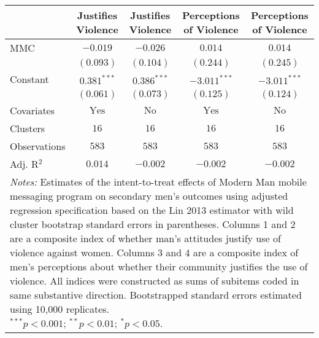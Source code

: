 
\begin{tabular}{l c c c c}
\toprule
 & Justifies Violence & Justifies Violence & Perceptions of Violence & Perceptions of Violence \\
\midrule
MMC          & $-0.019$       & $-0.026$      & $0.014$        & $0.014$        \\
             & $(0.093)$      & $(0.104)$     & $(0.244)$      & $(0.245)$      \\
Constant     & $0.381^{***}$  & $0.386^{***}$ & $-3.011^{***}$ & $-3.011^{***}$ \\
             & $(0.061)$      & $(0.073)$     & $(0.125)$      & $(0.124)$      \\
\midrule
Covariates   & $\textrm{Yes}$ & $\textrm{No}$ & $\textrm{Yes}$ & $\textrm{No}$  \\
Clusters     & $16$           & $16$          & $16$           & $16$           \\
Observations & $583$          & $583$         & $583$          & $583$          \\
Adj. R$^2$   & $0.014$        & $-0.002$      & $-0.002$       & $-0.002$       \\
\bottomrule
\multicolumn{5}{l}{\scriptsize{\parbox{\linewidth}{\vspace{2pt}
       \textit{Notes:} Estimates of the intent-to-treat effects of Modern Man mobile
       messaging program on secondary men's outcomes using adjusted regression
       specification based on the Lin 2013 estimator with wild cluster bootstrap
       standard errors in parentheses. Columns 1 and 2 are a composite index of
       whether man's attitudes justify use of violence against women. Columns 3 and 4
       are a composite index of men's perceptions about whether their community justifies
       the use of violence. All indices were constructed as sums of subitems coded in
       same substantive direction. Bootstrapped standard errors estimated using 10,000 replicates. \\ $^{***}p<0.001$; $^{**}p<0.01$; $^{*}p<0.05$.}}}
\end{tabular}
